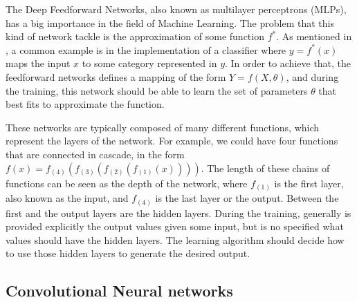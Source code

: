 The Deep Feedforward Networks, also known as multilayer perceptrons (MLPs), has a big importance in the field of Machine Learning. The problem that this kind of network tackle is the approximation of some function \begin{math} f^{*}\end{math}. As mentioned in \cite{goodfellow_bengio_courville_2017}, a common example is in the implementation of a classifier where \begin{math} y = f^{*}(x)\end{math} maps the input \begin{math} x \end{math} to some category represented in \begin{math} y \end{math}. In order to achieve that, the feedforward networks defines a mapping of the form \begin{math} Y = f(X, \theta)\end{math}, and during the training, this network should be able to learn the set of parameters \begin{math} \theta \end{math} that best fits to approximate the function.

These networks are typically composed of many different functions, which represent the layers of the network. For example, we could have four functions that are connected in cascade, in the form \begin{math} f(x) = f_{(4)}(f_{(3)}(f_{(2)}(f_{(1)}(x)))) \end{math}. The length of these chains of functions can be seen as the depth of the network, where \begin{math} f_{(1)} \end{math} is the first layer, also known as the input, and \begin{math} f_{(4)} \end{math} is the last layer or the output. Between the first and the output layers are the hidden layers. During the training, generally is provided explicitly the output values given some input, but is no specified what values should have the hidden layers. The learning algorithm should decide how to use those hidden layers to generate the desired output.

\subsection{Convolutional Neural networks}

